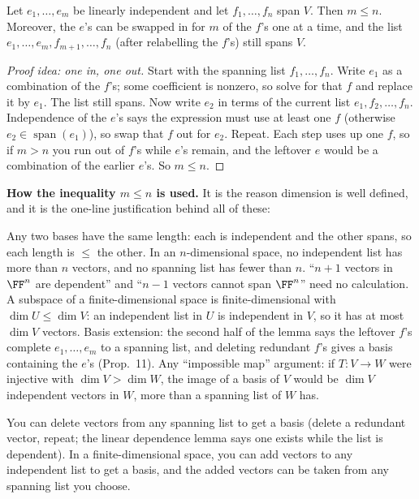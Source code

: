 \documentclass[11pt]{scrartcl}
\DeclareMathOperator{\spn}{span}
\begin{document}
\begin{theorem*}
  Let $e_1,\dots,e_m$ be linearly independent and let $f_1,\dots,f_n$ span $V$. Then $m\le n$.
  Moreover, the $e$'s can be swapped in for $m$ of the $f$'s one at a time, and the list $e_1,\dots,e_m,f_{m+1},\dots,f_n$ (after relabelling the $f$'s) still spans $V$.
\end{theorem*}
\begin{proof}[Proof idea: one in, one out]
  Start with the spanning list $f_1,\dots,f_n$. Write $e_1$ as a combination of the $f$'s; some coefficient is nonzero, so solve for that $f$ and replace it by $e_1$. The list still spans.
  Now write $e_2$ in terms of the current list $e_1,f_2,\dots,f_n$. Independence of the $e$'s says the expression must use at least one $f$ (otherwise $e_2\in\spn(e_1)$), so swap that $f$ out for $e_2$.
  Repeat. Each step uses up one $f$, so if $m>n$ you run out of $f$'s while $e$'s remain, and the leftover $e$ would be a combination of the earlier $e$'s. So $m\le n$.
\end{proof}
\textbf{How the inequality $m\le n$ is used.} It is the reason dimension is well defined, and it is the one-line justification behind all of these:
\begin{itemize}
  \ii Any two bases have the same length: each is independent and the other spans, so each length is $\le$ the other.
  \ii In an $n$-dimensional space, no independent list has more than $n$ vectors, and no spanning list has fewer than $n$.
  \ii ``$n+1$ vectors in $\FF^n$ are dependent'' and ``$n-1$ vectors cannot span $\FF^n$'' need no calculation.
  \ii A subspace of a finite-dimensional space is finite-dimensional with $\dim U\le\dim V$: an independent list in $U$ is independent in $V$, so it has at most $\dim V$ vectors.
  \ii Basis extension: the second half of the lemma says the leftover $f$'s complete $e_1,\dots,e_m$ to a spanning list, and deleting redundant $f$'s gives a basis containing the $e$'s (Prop.~11).
  \ii Any ``impossible map'' argument: if $T\colon V\to W$ were injective with $\dim V>\dim W$, the image of a basis of $V$ would be $\dim V$ independent vectors in $W$, more than a spanning list of $W$ has.
\end{itemize}

\begin{proposition*}
  You can delete vectors from any spanning list to get a basis (delete a redundant vector, repeat; the linear dependence lemma says one exists while the list is dependent).
  In a finite-dimensional space, you can add vectors to any independent list to get a basis, and the added vectors can be taken from any spanning list you choose.
\end{proposition*}
\end{document}
